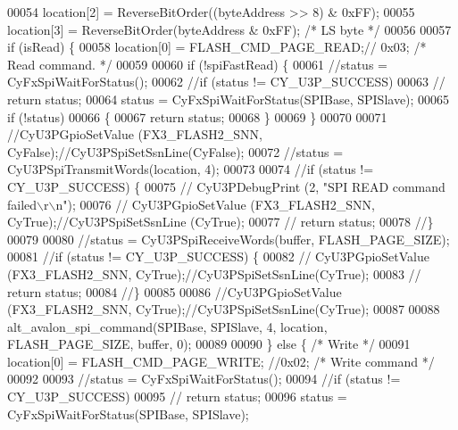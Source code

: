 \begin{DoxyCode}
00054         location[2] = ReverseBitOrder((byteAddress >> 8) & 0xFF);
00055         location[3] = ReverseBitOrder(byteAddress & 0xFF);               \textcolor{comment}{/* LS byte */}
00056 
00057         \textcolor{keywordflow}{if} (isRead) \{
00058             location[0] = FLASH_CMD_PAGE_READ;\textcolor{comment}{// 0x03; /* Read command. */}
00059 
00060             \textcolor{keywordflow}{if} (!spiFastRead) \{
00061                 \textcolor{comment}{//status = CyFxSpiWaitForStatus();}
00062                 \textcolor{comment}{//if (status != CY\_U3P\_SUCCESS)}
00063                 \textcolor{comment}{//    return status;}
00064                 status = CyFxSpiWaitForStatus(SPIBase, SPISlave);
00065                 \textcolor{keywordflow}{if} (!status)
00066                 \{
00067                     \textcolor{keywordflow}{return} status;
00068                 \}
00069             \}
00070 
00071             \textcolor{comment}{//CyU3PGpioSetValue (FX3\_FLASH2\_SNN, CyFalse);//CyU3PSpiSetSsnLine(CyFalse);}
00072             \textcolor{comment}{//status = CyU3PSpiTransmitWords(location, 4);}
00073 
00074             \textcolor{comment}{//if (status != CY\_U3P\_SUCCESS) \{}
00075             \textcolor{comment}{//    CyU3PDebugPrint (2, "SPI READ command failed\(\backslash\)r\(\backslash\)n");}
00076             \textcolor{comment}{//    CyU3PGpioSetValue (FX3\_FLASH2\_SNN, CyTrue);//CyU3PSpiSetSsnLine (CyTrue);}
00077             \textcolor{comment}{//    return status;}
00078             \textcolor{comment}{//\}}
00079 
00080             \textcolor{comment}{//status = CyU3PSpiReceiveWords(buffer, FLASH\_PAGE\_SIZE);}
00081             \textcolor{comment}{//if (status != CY\_U3P\_SUCCESS) \{}
00082             \textcolor{comment}{//  CyU3PGpioSetValue (FX3\_FLASH2\_SNN, CyTrue);//CyU3PSpiSetSsnLine(CyTrue);}
00083             \textcolor{comment}{//    return status;}
00084             \textcolor{comment}{//\}}
00085 
00086             \textcolor{comment}{//CyU3PGpioSetValue (FX3\_FLASH2\_SNN, CyTrue);//CyU3PSpiSetSsnLine(CyTrue);}
00087 
00088             alt_avalon_spi_command(SPIBase, SPISlave, 4, location, FLASH\_PAGE\_SIZE, buffer, 0);
00089 
00090         \} \textcolor{keywordflow}{else} \{ \textcolor{comment}{/* Write */}
00091             location[0] = FLASH_CMD_PAGE_WRITE; \textcolor{comment}{//0x02; /* Write command */}
00092 
00093             \textcolor{comment}{//status = CyFxSpiWaitForStatus();}
00094             \textcolor{comment}{//if (status != CY\_U3P\_SUCCESS)}
00095             \textcolor{comment}{//    return status;}
00096             status = CyFxSpiWaitForStatus(SPIBase, SPISlave);

\end{DoxyCode}
